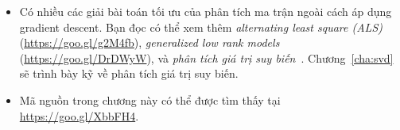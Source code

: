 \begin{itemize}
\item Có nhiều các giải bài toán tối ưu của phân tích ma trận ngoài cách áp dụng gradient descent. Bạn đọc có thể xem thêm
\textit{alternating least square (ALS)} (\url{https://goo.gl/g2M4fb}),
\textit{generalized low rank models} (\url{https://goo.gl/DrDWyW}), và
\textit{phân tích giá trị suy biến}~\cite{sarwar2002incremental,paterek2007improving}.
Chương~\ref{cha:svd} sẽ trình bày kỹ về phân tích giá trị suy biến.

\item Mã nguồn trong chương này có thể được tìm thấy tại \url{https://goo.gl/XbbFH4}.
\end{itemize}




